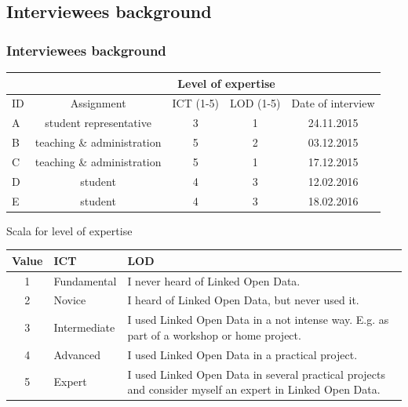 \documentclass{beamer}
\begin{document}
\begin{frame}
\subsection[Interviewees background]{Interviewees background}
\frametitle{Interviewees background}
\begin{table}[h]
	\small
	\begin{tabular}{| l | c | c | c | c |}
 		\multicolumn{2}{c|}{} & \multicolumn{2}{c|}{Level of expertise} \\
 		\hline
		ID & Assignment & ICT (1-5) & LOD (1-5) & Date of interview \\
		\hline
		A  & student representative & 3 & 1 & 24.11.2015\\
		B & teaching \& administration & 5 & 2 & 03.12.2015\\
		C & teaching \& administration & 5 & 1 & 17.12.2015\\
		D & student & 4 & 3 & 12.02.2016\\
		E & student & 4 & 3 & 18.02.2016\\
		\hline
	\end{tabular}
	\label{table:interviewee-background}
\end{table}
\begin{block}{Scala for level of expertise}
\begin{table}[h]
	\footnotesize 
	\begin{tabular}{ c | l  | p{6.5cm} }
		Value & ICT & LOD\\	
		\hline
		1 & Fundamental & I never heard of Linked Open Data.\\
		\hline
		2 & Novice & I heard of Linked Open Data, but never used it.\\
		\hline
		3 & Intermediate & I used Linked Open Data in a not intense way. E.g. as part of a workshop or home project.\\
		\hline
		4 & Advanced & I used Linked Open Data in a practical project.\\
		\hline
		5 & Expert & I used Linked Open Data in several practical projects and consider myself an expert in Linked Open Data.\\
	\end{tabular}
	\label{table:interviews-rating scales}
\end{table}
\end{block}
\end{frame}


\end{document}

